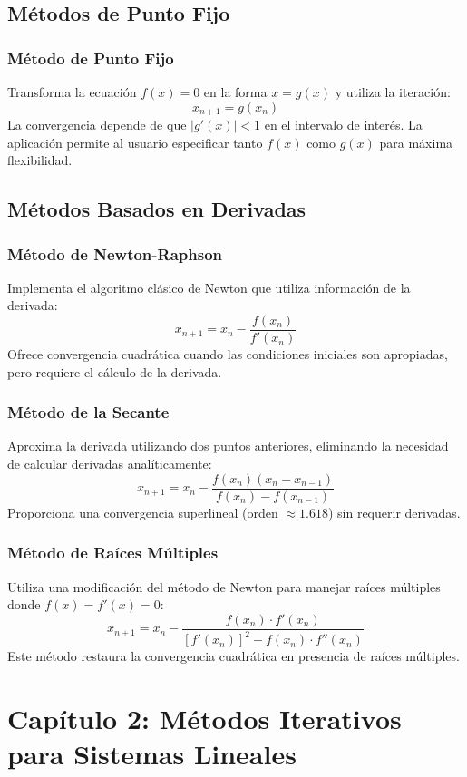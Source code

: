 \subsection{Métodos de Punto Fijo}

\subsubsection{Método de Punto Fijo}
Transforma la ecuación $f(x) = 0$ en la forma $x = g(x)$ y utiliza la iteración:
\[
x_{n+1} = g(x_n)
\]
La convergencia depende de que $|g'(x)| < 1$ en el intervalo de interés. La aplicación permite al usuario especificar tanto $f(x)$ como $g(x)$ para máxima flexibilidad.

\subsection{Métodos Basados en Derivadas}

\subsubsection{Método de Newton-Raphson}
Implementa el algoritmo clásico de Newton que utiliza información de la derivada:
\[
x_{n+1} = x_n - \frac{f(x_n)}{f'(x_n)}
\]
Ofrece convergencia cuadrática cuando las condiciones iniciales son apropiadas, pero requiere el cálculo de la derivada.

\subsubsection{Método de la Secante}
Aproxima la derivada utilizando dos puntos anteriores, eliminando la necesidad de calcular derivadas analíticamente:
\[
x_{n+1} = x_n - \frac{f(x_n)(x_n - x_{n-1})}{f(x_n) - f(x_{n-1})}
\]
Proporciona una convergencia superlineal (orden $\approx 1.618$) sin requerir derivadas.

\subsubsection{Método de Raíces Múltiples}
Utiliza una modificación del método de Newton para manejar raíces múltiples donde $f(x) = f'(x) = 0$:
\[
x_{n+1} = x_n - \frac{f(x_n) \cdot f'(x_n)}{[f'(x_n)]^2 - f(x_n) \cdot f''(x_n)}
\]
Este método restaura la convergencia cuadrática en presencia de raíces múltiples.

\section{Capítulo 2: Métodos Iterativos para Sistemas Lineales}

